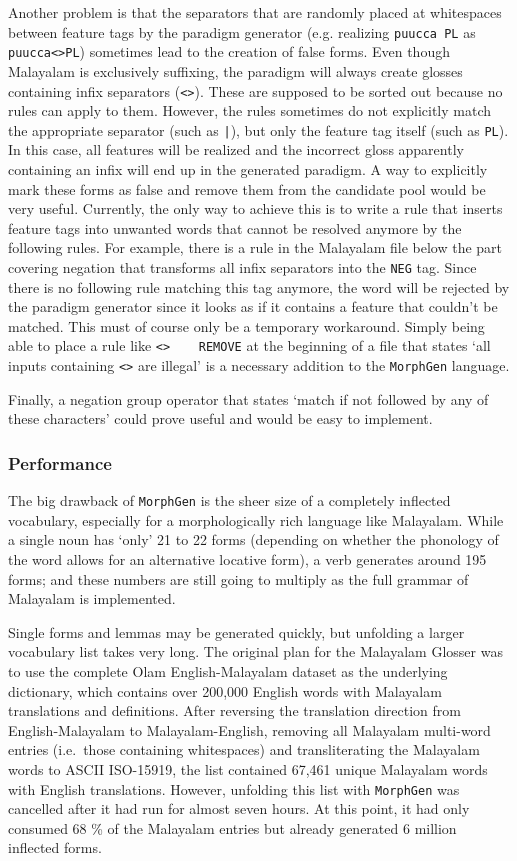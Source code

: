 \documentclass[a4paper]{article}
\newcommand{\tab}{~~~}
\newcommand{\typ}[1]{\texttt{#1}}
\begin{document}
Another problem is that the separators that are randomly placed at whitespaces between feature tags by the paradigm generator (e.g. realizing \typ{puucca PL} as \typ{puucca<>PL}) sometimes lead to the creation of false forms. Even though Malayalam is exclusively suffixing, the paradigm will always create glosses containing infix separators (\typ{<>}). These are supposed to be sorted out because no rules can apply to them. However, the rules sometimes do not explicitly match the appropriate separator (such as \typ{|}), but only the feature tag itself (such as \typ{PL}). In this case, all features will be realized and the incorrect gloss apparently containing an infix will end up in the generated paradigm. A way to explicitly mark these forms as false and remove them from the candidate pool would be very useful. Currently, the only way to achieve this is to write a rule that inserts feature tags into unwanted words that cannot be resolved anymore by the following rules. For example, there is a rule in the Malayalam file below the part covering negation that transforms all infix separators into the \typ{NEG} tag. Since there is no following rule matching this tag anymore, the word will be rejected by the paradigm generator since it looks as if it contains a feature that couldn't be matched. This must of course only be a temporary workaround. Simply being able to place a rule like \typ{<> \tab REMOVE} at the beginning of a file that states `all inputs containing \typ{<>} are illegal' is a necessary addition to the \typ{MorphGen} language.

Finally, a negation group operator that states `match if not followed by any of these characters' could prove useful and would be easy to implement.

\subsubsection{Performance}

The big drawback of \typ{MorphGen} is the sheer size of a completely inflected vocabulary, especially for a morphologically rich language like Malayalam. While a single noun has `only' 21 to 22 forms (depending on whether the phonology of the word allows for an alternative locative form), a verb generates around 195 forms; and these numbers are still going to multiply as the full grammar of Malayalam is implemented.

Single forms and lemmas may be generated quickly, but unfolding a larger vocabulary list takes very long. The original plan for the Malayalam Glosser was to use the complete Olam English-Malayalam dataset \parencite{olam} as the underlying dictionary, which contains over 200,000 English words with Malayalam translations and definitions. After reversing the translation direction from English-Malayalam to Malayalam-English, removing all Malayalam multi-word entries (i.e.\ those containing whitespaces) and transliterating the Malayalam words to ASCII ISO-15919, the list contained 67,461 unique Malayalam words with English translations. However, unfolding this list with \typ{MorphGen} was cancelled after it had run for almost seven hours. At this point, it had only consumed 68 \% of the Malayalam entries but already generated 6 million inflected forms.
\end{document}
